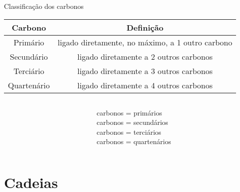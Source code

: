 \documentclass[presentation,professionalfonts,aspectratio=169]{beamer}
\begin{document}
\begin{frame}[label={sec:org334ff13}]{Classificação dos carbonos}
\begin{center}
\begin{tabular}{|c|c|}
\hline
\cellcolor{green!20} {\bfseries Carbono}  & \cellcolor{green!20} {\bfseries Definição} \\
\hline
Primário & ligado diretamente, \alert{no máximo}, a \alert{1} outro carbono\\
\hline
Secundário & ligado diretamente a \alert{2} outros carbonos\\
\hline
Terciário & ligado diretamente  a \alert{3} outros carbonos\\
\hline
Quartenário & ligado diretamente a \alert{4} outros carbonos\\
\hline
\end{tabular}
\end{center}



\begin{columns}
\begin{column}{0.7\textwidth}
\chemmove{
\node[bal,fit=(A)]{};
\node[bal,fit=(B)]{};
\node[bal,fit=(D)]{};
\node[bal,fit=(E)]{};
\node[rect,fit=(F)]{};
\node[rect,fit=(G)]{};
\node[rect,fit=(H)]{};
\node[rect,fit=(I)]{};
\node[rect,fit=(J)]{};
\node[rect,fit=(K)]{};
\node[bal2,fit=(L)]{};
\node[bal2,fit=(M)]{};
\node[bal3,fit=(N)]{};
}
\end{column}
\begin{column}{0.3\textwidth}  %
      carbonos  = primários\\
      carbonos  = secundários\\
      carbonos  = terciários\\
      carbonos  = quartenários
     \chemmove{
      \node[bal,fit=(A)]{};
      \node[rect,fit=(B)]{};
      \node[bal2,fit=(D)]{};
      \node[bal3,fit=(E)]{};
      }
\end{column}
\end{columns}
\end{frame}
\section{Cadeias}
\label{sec:org86135d8}
\end{document}
